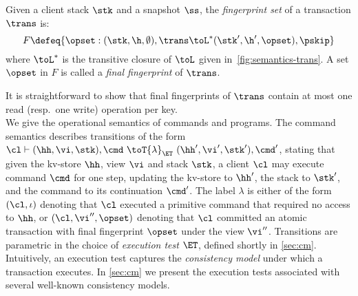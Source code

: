 \begin{definition}
Given a client stack $\stk$ and a snapshot $\ss$, the \emph{fingerprint set} of a transaction $\trans$ is:
\[F \defeq
\{\opset : (\stk, \h, \emptyset), \trans \toL^* (\stk', \h', \opset),
\pskip \}
\]
where $\toL^*$ is the transitive closure of $\toL$ given in~\cref{fig:semantics-trans}.  
A set $\opset$ in $F$ is called a \emph{final fingerprint} of $\trans$. 
\end{definition}
\noindent It is straightforward to show that final fingerprints of $\trans$ contain at most one read (resp.\ one write) operation per key. \\


We give the operational semantics of commands and programs. 
The command semantics describes transitions of the form
$\cl \vdash (\hh, \vi, \stk), \cmd \ \toT{\lambda}_{\ET} \ (\hh', \vi', \stk') ,
\cmd'$, stating that given the kv-store $\hh$, view $\vi$ and stack $\stk$, 
a client $\cl$ may execute command $\cmd$ for one step, updating 
the kv-store to $\hh'$, the stack to $\stk'$, and the command to its continuation $\cmd'$.
The label $\lambda$ is either of the form $(\cl, \iota)$ denoting that $\cl$ executed a primitive command
that required no access to $\hh$, 
or $(\cl, \vi'', \opset)$ denoting that $\cl$ committed an atomic transaction with final fingerprint $\opset$ under the view $\vi''$.
Transitions are parametric in the choice of \emph{execution test} $\ET$, defined shortly in \cref{sec:cm}.
Intuitively, an execution test captures the \emph{consistency model} under which a transaction executes.
In \cref{sec:cm} we present the execution tests associated with several well-known consistency models.  %




